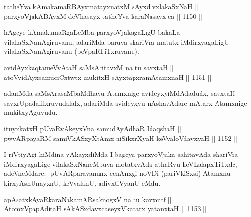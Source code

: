 
\begin{shl}
tatheYva kAmakamaRBAyxmatayxnatxM sAyxdivxlakaSxNaH || \\
parxyoVjakABAyxM deVhasayx tatheYva karaNasayx ca ||  1150 ||  
\end{shl}

\begin{artha}
hAgeye kAmakamaRgaLeMba parxyoVjakagaLigU bahaLa vilakaSxNanAgiruvanu, adariMda baruva shariVra matutx iMdirxyagaLigU vilakaSxNanAgiruvanu (beVpaRTiTxruvanu).
\end{artha}

\begin{shl}
avidAyxkaqtameVvAtaH saMsAritavxM na tu savxtaH || \\
atoV\s vidAyxsamuciCxtwtx mukitxH sAyxtapxramAtamxnaH ||  1151 ||  
\end{shl}

\begin{artha}
adariMda saMsArasaMbaMdhavu Atamxnige avideyxyiMdAdadudx, savxtaH savxrUpadalilxruvudalalx, adariMda avideyxyu nAshavAdare mAtarx Atamxnige mukitxyAguvudu.
\end{artha}

\begin{shl}
ituyxkatxH \footnotemark[1]pUvaRvAkeyxVna samudAyAdhaR IdaqshaH || \\
pwvARpayaRM samiVkASxyX\s \s tAmx niSikxrXyaH keVvaloV\s davxyaH ||  1152 ||  
\end{shl}

\begin{artha}
I riVtiyAgi hiMdina vAkayxdiMda I bageya parxyoVjaka sahitavAda shariVra iMdirxyagaLige vilakaSxNaneMbuva motatxvAda athaRvu heVLalapxTiTxde, adeVneMdare:-
pUvARparavanunx cenAnxgi noVDi (pariVkiSxsi) Atamxnu kirxyAshUnayxnU, keVvalanU, adivxtiVyanU eMdu.
\end{artha}


\begin{shl}
apAsatxkAyaRkaraNakamARsaknogxV na tu kavxcitf || \\
AtomxVpapAditaH sAkASxdavxcaseyxVkatarx yatanxtaH ||  1153 ||  
\end{shl}
				
